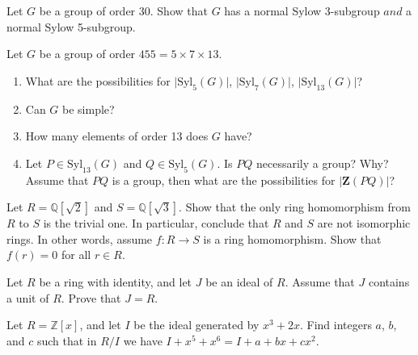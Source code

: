 \documentclass[12pt,letterpaper,boxed]{hmcpset}
\begin{document}


\begin{problem}[12.3.13]
Let $G$ be a group of order 30. Show that $G$ has a normal Sylow 3-subgroup $\textit{and}$ a normal Sylow 5-subgroup. 
\end{problem}

\begin{solution}
\end{solution}

\clearpage

\begin{problem}[12.3.16]
Let $G$ be a group of order $455 = 5 \times 7 \times 13$.
\begin{enumerate}[label=\alph*]
\item What are the possibilities for $\vert \text{Syl}_5(G) \vert$, $\vert \text{Syl}_7(G) \vert$, $\vert \text{Syl}_{13}(G) \vert$?
\item Can $G$ be simple?
\item How many elements of order 13 does $G$ have?
\item Let $P \in \text{Syl}_{13}(G)$ and $Q \in \text{Syl}_5(G)$. Is $PQ$ necessarily a group? Why? Assume that $PQ$ is a group, then what are the possibilities for $\vert \textbf{Z}(PQ) \vert$?
\end{enumerate}
\end{problem}

\begin{solution}
\end{solution}

\clearpage

\begin{problem}[16.1.10]
Let $R = \mathbb{Q}[\sqrt{2}]$ and $S = \mathbb{Q}[\sqrt{3}]$. Show that the only ring homomorphism from $R$ to $S$ is the trivial one. In particular, conclude that $R$ and $S$ are not isomorphic rings. In other words, assume $f : R \rightarrow S$ is a ring homomorphism. Show that $f(r) = 0$ for all $r \in R$.
\end{problem}

\begin{solution}
\end{solution}

\clearpage

\begin{problem}[16.1.20]
Let $R$ be a ring with identity, and let $J$ be an ideal of $R$. Assume that $J$ contains a unit of $R$. Prove that $J = R$.
\end{problem}

\begin{solution}
\end{solution}

\clearpage

\begin{problem}[16.2.4]
Let $R = \mathbb{Z}[x]$, and let $I$ be the ideal generated by $x^3 + 2x$. Find integers $a$, $b$, and $c$ such that in $R/I$ we have $I + x^5 + x^6 = I + a + bx + cx^2$.
\end{problem}

\begin{solution}
\end{solution}
\end{document}
